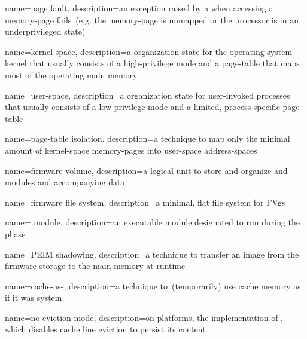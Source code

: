 {
  name={page fault},
  description={an exception raised by a  when accessing a \gls{memory-page} fails~(e.g. the \gls{memory-page} is unmapped or the processor is in an underprivileged state)}
}

{
  name={kernel-space},
  description={a  organization state for the operating system kernel that usually consists of a high-privilege  mode and a \gls{page-table} that maps most of the operating main memory}
}

{
  name={user-space},
  description={a  organization state for user-invoked processes that usually consists of a low-privilege  mode and a limited, process-specific \gls{page-table}}
}

{
  name={\gls{page-table} isolation},
  description={a technique to map only the minimal amount of \gls{kernel-space} \glspl{memory-page} into \gls{user-space} \glspl{address-space}}
}

{
  name={firmware volume},
  description={a logical unit to store and organize  and  modules and accompanying data}
}

{
  name={firmware file system},
  description={a minimal, flat file system for \glspl{FVg}}
}

{
  name={ module},
  description={an executable module designated to run during the   phase}
}

{
  name={\gls{PEIM} shadowing},
  description={a technique to transfer an  \gls{image} from the \gls{firmware} storage to the main memory at runtime}
}

{
  name={cache-as-},
  description={a technique to~(temporarily) use cache memory as if it was system }
}

{
  name={no-eviction mode},
  description={on  platforms, the implementation of , which disables cache line eviction to persist its content}
}

